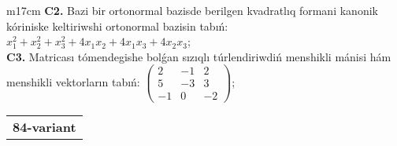 \documentclass{article}
\begin{document}
\begin{tabular}{m{17cm}}
\textbf{C2.} Bazi bir ortonormal bazisde berilgen kvadratlıq formani kanonik kóriniske keltiriwshi ortonormal bazisin tabıń: \(x_{1}^{2} + x_{2}^{2} + x_{3}^{2} + 4x_{1}x_{2} + 4x_{1}x_{3} + 4x_{2}x_{3}\); \\
\textbf{C3.} Matricası tómendegishe bolǵan sızıqlı túrlendiriwdiń menshikli mánisi hám menshikli vektorların tabıń: \(\begin{pmatrix} 2 & - 1 & 2 \\ 5 & - 3 & 3 \\  - 1 & 0 & - 2 \end{pmatrix}\); \\

\end{tabular}
\vspace{1cm}


\begin{tabular}{m{17cm}}
\textbf{84-variant}
\newline


\end{tabular}
\end{document}
